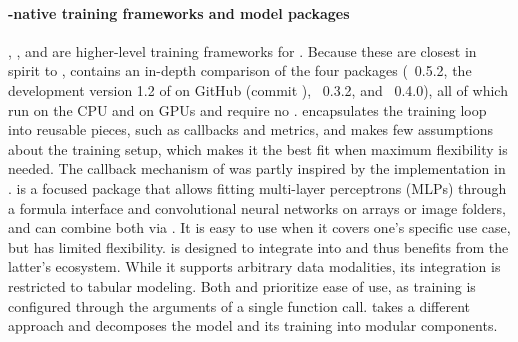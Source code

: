 \documentclass[article,shortnames]{jss}
\theoremstyle{definition}
\begin{document}
\paragraph{\rlang{}-native training frameworks and model packages}
\luz{} \citep{ref-luz2025},  \citep{ref-cito2024}, and  \citep{ref-soetewey2026kindling} are higher-level training frameworks for \torch{}.
Because these are closest in spirit to ,  contains an in-depth comparison of the four packages (\luz{}~0.5.2, the development version 1.2 of  on GitHub (commit ), ~0.3.2, and \mlrttorch{}~0.4.0), all of which run on the CPU and on GPUs and require no \python{}.
\luz{} encapsulates the training loop into reusable pieces, such as callbacks and metrics, and makes few assumptions about the training setup, which makes it the best fit when maximum flexibility is needed.
The callback mechanism of \mlrttorch{} was partly inspired by the implementation in \luz{}.
 is a focused package that allows fitting multi-layer perceptrons (MLPs) through a formula interface and convolutional neural networks on arrays or image folders, and can combine both via . It is easy to use when it covers one's specific use case, but has limited flexibility.
 is designed to integrate  into  and thus benefits from the latter's ecosystem.
While it supports arbitrary data modalities, its  integration is restricted to tabular modeling.
Both  and  prioritize ease of use, as training is configured through the arguments of a single function call.
\mlrttorch{} takes a different approach and decomposes the model and its training into modular components.
\end{document}
